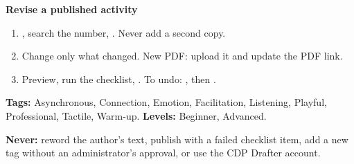 \textbf{Revise a published activity}
\begin{enumerate}
  \item {}, search the number, . Never add a second copy.
  \item Change only what changed. New PDF: upload it and update the PDF link.
  \item Preview, run the checklist, . To undo: , then .
\end{enumerate}

\textbf{Tags:} Asynchronous, Connection, Emotion, Facilitation, Listening, Playful, Professional, Tactile, Warm-up. \textbf{Levels:} Beginner, Advanced.

\textbf{Never:} reword the author's text, publish with a failed checklist item, add a new tag without an administrator's approval, or use the CDP Drafter account.


